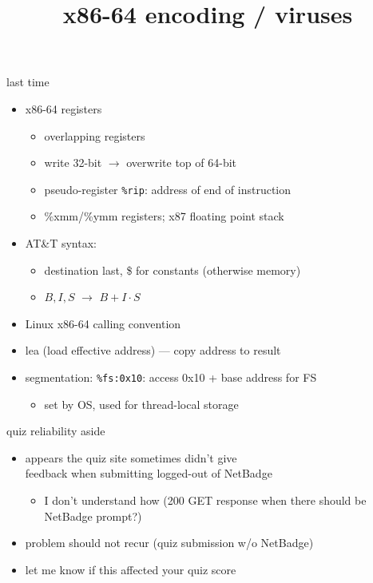 \graphicspath{{./figures/}}
\title{x86-64 encoding / viruses}
\date{}

\begin{frame}
    \titlepage
\end{frame}

\begin{frame}{last time}
    \begin{itemize}
    \item x86-64 registers
        \begin{itemize}
        \item overlapping registers
        \item write 32-bit $\rightarrow$ overwrite top of 64-bit
        \item pseudo-register {\tt \%rip}: address of end of instruction
        \item \%xmm/\%ymm registers; x87 floating point stack
        \end{itemize}
    \item AT\&T syntax:
        \begin{itemize}
        \item destination last, \$ for constants (otherwise memory)
        \item \(B,I,S\) $\rightarrow$ $B + I \cdot S$
        \end{itemize}
    \item Linux x86-64 calling convention
    \item lea (load effective address) --- copy address to result
    \item segmentation: {\tt \%fs:0x10}: access 0x10 + base address for FS 
        \begin{itemize}
        \item set by OS, used for thread-local storage
        \end{itemize}
    \end{itemize}
\end{frame}

\begin{frame}{quiz reliability aside}
    \begin{itemize}
    \item appears the quiz site sometimes didn't give \\
        feedback when submitting logged-out of NetBadge
        \begin{itemize}
        \item I don't understand how (200 GET response when there should be NetBadge prompt?)
        \end{itemize}
    \item problem should not recur (quiz submission w/o NetBadge)
    \vspace{.5cm}
    \item let me know if this affected your quiz score
    \end{itemize}
\end{frame}

